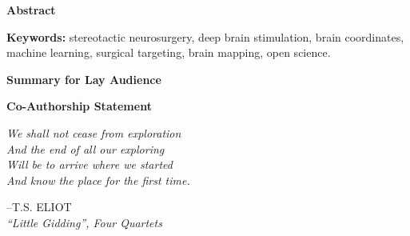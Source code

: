 \documentclass[hidelinks,12pt,oneside]{report}
\makeatletter
\numberwithin{figure}{chapter}
\newenvironment{preliminary}%
{\pagestyle{plain}\pagenumbering{roman}}%
{\pagenumbering{arabic}}
\newcommand\isco[1]{%
  \edef\@tempa{#1}%
  \def\@tempb{}%
  \ifx\@tempa\@tempb
	\else \\\underline{Co-Supervisor:}\vspace{0.35in}\\\dots\dots\dots\dots\dots\dots\dots\\{#1}\\
  \fi
}
\newcommand\isjoint[1]{%
  \edef\@tempa{#1}%
  \def\@tempb{}%
  \ifx\@tempa\@tempb
	\else \\\underline{Joint Supervisor:}\vspace{0.35in}\\\dots\dots\dots\dots\dots\dots\dots\\{#1}\\
  \fi
}
\newcommand\isalt[1]{%
  \edef\@tempa{#1}%
  \def\@tempb{}%
  \ifx\@tempa\@tempb
	\else \\\underline{Alternate Supervisor:}\vspace{0.35in}\\\dots\dots\dots\dots\dots\dots\dots\\{#1}\\
  \fi
}
\newcommand\isdefinedsig[1]{%
  \edef\@tempa{#1}%
  \def\@tempb{}%
  \ifx\@tempa\@tempb
	\else \\ \dots\dots\dots\dots\dots\dots\dots\\{#1}\\
  \fi
}
\newcommand\isdefinedspinetitle[1]{%
  \edef\@tempa{#1}%
  \def\@tempb{}%
  \ifx\@tempa\@tempb
	\else (Spine title: #1)\\
  \fi
}
\newcommand\acknowlege[1]{%
  \edef\@tempa{#1}%
  \def\@tempb{}%
  \ifx\@tempa\@tempb
	\else \newpage \Large Acknowledgements\normalsize\\\indent\\#1\newpage
  \fi
}
\newcommand{\super}{Dr. Supervisor1} %
\newcommand{\superj}{Dr. Supervisor2} %
\newcommand{\superc}{} %
\newcommand{\supera}{} %
\newcommand{\scoa}{Dr. Committee1}  %
\newcommand{\scob}{Dr. Committee2}  %
\newcommand{\scoc}{Dr. Committee3}  %
\newcommand{\sct}{}  %
\newcommand{\examo}{Dr. Examiner1}  %
\newcommand{\examt}{Dr. Examiner2}
\newcommand{\examth}{Dr. Examiner3}
\newcommand{\examf}{Dr. Examiner4}
\newcommand{\department}{School of Biomedical Engineering}
\newcommand{\degree}{Doctor of Philosophy}
\newcommand{\firstname}{Alaa}
\newcommand{\middlename}{}
\newcommand{\lastname}{Taha}
\newcommand{\authorname}{{\firstname} {\middlename} {\lastname}}
\newcommand{\titl}{Bridging coordinates and machine learning for brain mapping and stereotaxy}
\newcommand{\spinetitle}{}%
\newcommand{\thesisformat}{Integrated Article} %
\newcommand{\gyear}{\number\year}
\newcommand{\makeacknowlege} {
}
\renewcommand{\maketitle}
{\begin{titlepage}
   \setcounter{page}{1}
   \begin{large}
   \begin{center}
      \mbox{}
      \vfill
      {\MakeUppercase{\titl}}\\
      \isdefinedspinetitle{\spinetitle}
      (Thesis format: \thesisformat)\\
      \vfill
      by \\
      \vfill
      {\firstname{} \middlename } \underline{\lastname}\\
      \vfill
      Graduate Program in {\department}\\
      \vfill
		A thesis submitted in partial fulfillment\\
		of the requirements for the degree of\\
		\degree\\
		\vfill
		The School of Graduate and Postdoctoral Studies\\
		The University of Western Ontario\\
		London, Ontario, Canada\\
		\vfill
      {\copyright} {\authorname} {\gyear}  \\
      \vspace*{.2in}
   \end{center}
   \end{large}
   \end{titlepage}

}%
\newcommand{\makecert}{
   \setcounter{page}{2}
\vfill
\begin{center}
\large
THE UNIVERSITY OF WESTERN ONTARIO\\
School of Graduate and Postdoctoral Studies\\
\vfill
\textbf{CERTIFICATE OF EXAMINATION}
\end{center}

\vfill
\begin{table}[ht]
\begin{minipage}[t]{0.5\linewidth} %
\begin{tabular}{l}
\underline{Supervisor:}\vspace{0.35in}
\isdefinedsig{\super}
\isco{\superc}
\isjoint{\superj}
\isalt{\supera}
\\
\end{tabular}
\vfill
\end{minipage}
\hspace{0.5in}
\begin{minipage}[t]{0.5\linewidth}
\begin{tabular}{l}
\underline{Examiners:} \\\vspace{.5cm}
\isdefinedsig{\examo}\\
\isdefinedsig{\examt}\\
\isdefinedsig{\examth}\\
\isdefinedsig{\examf}
\end{tabular}
\vfill
\end{minipage}
\vfill
\end{table}
\vfill
\begin{center}
The thesis by \\ \vfill
\textbf{\firstname{} \middlename{} \underline{\lastname}}\\
\vfill
entitled:\\\vfill
\textbf{\titl}\\\vfill
is accepted in partial fulfillment of the \\
requirements for the degree of\\
\degree\\
\end{center}
\begin{table}[ht]
\begin{minipage}[t]{0.5\linewidth}
\begin{tabular}{l}
\dots\dots\dots\dots\dots\\
Date
\end{tabular}
\end{minipage}
\hspace{0.5in}
\begin{minipage}[t]{0.5\linewidth}
\begin{tabular}{l}
\dots\dots\dots\dots\dots\dots\dots\dots\dots\dots\\
Chair of the Thesis Examination Board
\end{tabular}
\end{minipage}
\end{table}

}
\makeatother
\begin{document}


\begin{preliminary}

\setcounter{page}{2}
{}
\Large\begin{center}\textbf{Abstract}\end{center}\normalsize


\vfill
\noindent\textbf{Keywords:} stereotactic neurosurgery, deep brain stimulation, brain coordinates, machine learning, surgical targeting, brain mapping, open science.
\newpage


\clearpage
{}
{}
\Large\begin{center}\textbf{Summary for Lay Audience}\end{center}\normalsize



\vfill
\newpage

{}
\Large\begin{center}\textbf{Co-Authorship Statement}\end{center}\normalsize

\vfill
\newpage
\thispagestyle{empty}
\vspace*{\fill}

\begin{flushleft}
\hspace{3cm}
\begin{minipage}{0.6\textwidth}
  {\Large\itshape
  We shall not cease from exploration\\
  And the end of all our exploring\\
  Will be to arrive where we started\\
  And know the place for the first time.\par\bigskip}
  \hfill\MakeUppercase{--T.S. Eliot}\\
  \hfill\textit{“Little Gidding”, Four Quartets}
\end{minipage}
\end{flushleft}


\end{preliminary}
\end{document}
